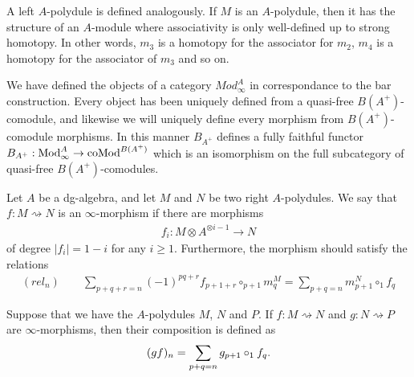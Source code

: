 \documentclass[../thesis.tex]{subfiles}
\begin{document}
            A left $A$-polydule is defined analogously. If $M$ is an $A$-polydule, then it has the structure of an $A$-module where associativity is only well-defined up to strong homotopy. In other words, $m_3$ is a homotopy for the associator for $m_2$, $m_4$ is a homotopy for the associator of $m_3$ and so on. 

            We have defined the objects of a category $Mod_\infty^A$ in correspondance to the bar construction. Every object has been uniquely defined from a quasi-free $B(A^+)$-comodule, and likewise we will uniquely define every morphism from $B(A^+)$-comodule morphisms. In this manner $B_{A^+}$ defines a fully faithful functor $B_{A^+} : \tt{Mod}_\infty^A \rightarrow \tt{coMod}^{B(A^+)}$ which is an isomorphism on the full subcategory of quasi-free $B(A^+)$-comodules.
            
            \begin{definition}
                Let $A$ be a dg-algebra, and let $M$ and $N$ be two right $A$-polydules. We say that $f : M \rightsquigarrow N$ is an $\infty$-morphism if there are morphisms
                \begin{align*}
                    f_i : M \otimes A^{\otimes i - 1} \rightarrow N
                \end{align*}
                of degree $|f_i| = 1 - i$ for any $i \geq 1$. Furthermore, the morphism should satisfy the relations
                \begin{align*}
                    (rel_n)\qquad \sum_{p+q+r = n} (-1)^{pq+r}f_{p+1+r} \circ_{p+1} m^M_{q} = \sum_{p+q = n} m^N_{p+1} \circ_1 f_q
                \end{align*}
            \end{definition}
            

            Suppose that we have the $A$-polydules $M$, $N$ and $P$. If $f : M \rightsquigarrow N$ and $g : N \rightsquigarrow P$ are $\infty$-morphisms, then their composition is defined as
            \begin{align*}
                (gf)_n = \sum_{p+q=n}g_{p+1}\circ_1 f_q\tt{.}
            \end{align*}
\end{document}
